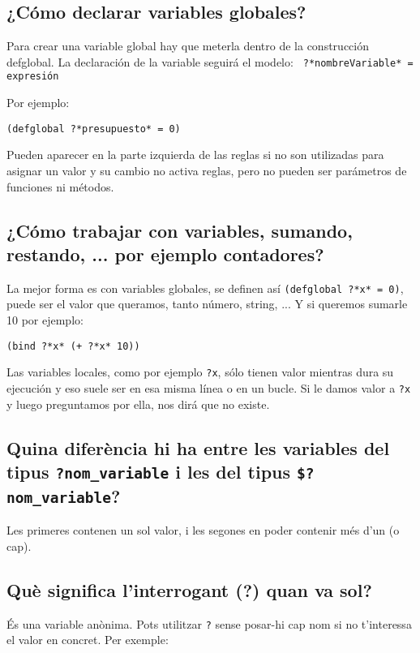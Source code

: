 \documentclass[11pt,svgnames]{scrbook}
\begin{document}
\subsection{¿Cómo declarar variables globales?}

Para crear una variable global hay que meterla dentro de la construcción defglobal. La declaración de la variable seguirá el modelo:   \texttt{ ?*nombreVariable* = expresión}

Por ejemplo:
\medskip

\texttt{(defglobal ?*presupuesto* = 0)}
\medskip

Pueden aparecer en la parte izquierda de las reglas si no son utilizadas para asignar un valor y su cambio no activa reglas, pero no pueden ser parámetros de funciones ni métodos.

\subsection{¿Cómo trabajar con variables, sumando, restando, ... por ejemplo
contadores?}

La mejor forma es con variables globales, se definen así
\texttt{(defglobal ?*x* = 0)}, puede ser el valor que queramos, tanto número,
string, ...
Y si queremos sumarle 10 por ejemplo:
\medskip

\texttt{(bind ?*x* (+ ?*x* 10))}
\medskip

Las variables locales, como por ejemplo \texttt{?x}, sólo tienen valor mientras
dura su ejecución y eso suele ser en esa misma línea o en un bucle. Si le damos
valor a \texttt{?x} y luego preguntamos por ella, nos dirá que no existe.

\subsection{Quina diferència hi ha entre les variables del tipus
{\tt ?nom\_variable} i les del tipus {\tt \$?nom\_variable}?}

Les primeres contenen un sol valor, i les segones en poder contenir més d'un (o
cap).


\subsection{Què significa l'interrogant (?) quan va sol?}

És una variable anònima. Pots utilitzar \texttt{?} sense posar-hi cap nom si
no t'interessa el valor en concret.
Per exemple:
\medskip
\end{document}
